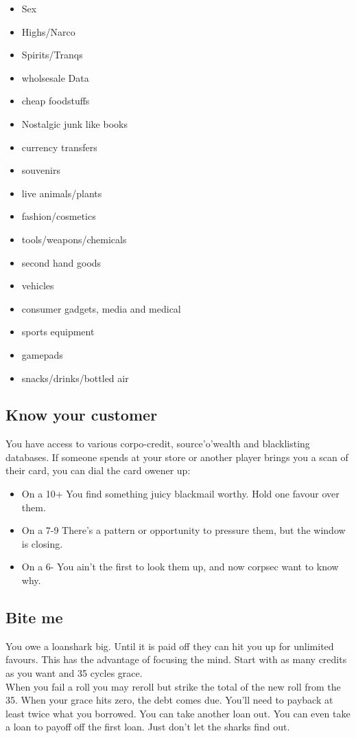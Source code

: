 \documentclass{tufte-book}
\begin{document}
\begin{multicols}{3}
\begin{itemize}
\item Sex
\item Highs/Narco
\item Spirits/Tranqs
\item wholsesale Data
\item cheap foodstuffs
\item Nostalgic junk like books
\item currency transfers
\item souvenirs
\item live animals/plants
\item fashion/cosmetics
\item tools/weapons/chemicals
\item second hand goods
\item vehicles
\item consumer gadgets, media and medical
\item sports equipment
\item gamepads
\item snacks/drinks/bottled air
\end{itemize}
\end{multicols}

\subsection{Know your customer}
You have access to various corpo-credit, source'o'wealth and blacklisting databases. If someone spends at your store or another player brings you a scan of their card, you can dial the card owener up: 
\begin{itemize}
\item On a 10+ You find something juicy blackmail worthy. Hold one favour over them.
\item On a  7-9 There's a pattern or opportunity to pressure them, but the window is closing.
\item On a 6- You ain't the first to look them up, and now corpsec want to know why.
\end{itemize}

\subsection{Bite me}
You owe a loanshark big. Until it is paid off they can hit you up for unlimited favours. This has the advantage of focusing the mind. Start with as many credits as you want and 35 cycles grace. \\ When you fail a roll you may reroll but strike the total of the new roll from the 35. When your grace hits zero, the debt comes due. You'll need to payback at least twice what you borrowed. You can take another loan out. You can even take a loan to payoff off the first loan. Just don't let the sharks find out.
\end{document}
